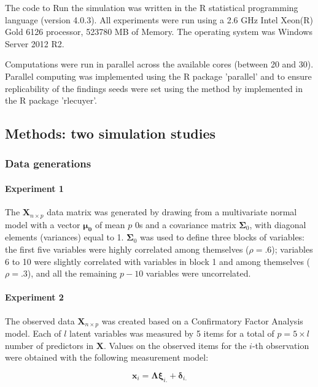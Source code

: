 	The code to Run the simulation was written in the R statistical programming language (version 4.0.3). 
	All experiments were run using a 2.6 GHz Intel Xeon(R) Gold 6126 processor, 523780 MB of Memory. The
	operating system was Windows Server 2012 R2.

	Computations were run in parallel across the available cores (between 20 and 30). Parallel computing 
	was implemented using the R package 'parallel' and to ensure replicability of the findings seeds were
	set using the method by \cite{lecuyer:2002} implemented in the R package 'rlecuyer'.

\subsection{Methods: two simulation studies}

\subsubsection{Data generations}

	\paragraph{Experiment 1} 
	The $\bm{X}_{n \times p}$ data matrix was generated by drawing from a multivariate normal 
	model with a vector $\bm{\mu_0}$ of mean $p$ 0s and a covariance matrix $\bm{\Sigma}_0$, with diagonal 
	elements (variances) equal to 1. 
	$\bm{\Sigma}_0$ was used to define three blocks of variables: 
	the first five variables were highly correlated among themselves ($\rho = .6$); 
	variables 6 to 10 were slightly correlated with variables in block 1 and among themselves ($\rho = .3$), 
	and all the remaining $p-10$ variables were uncorrelated.

	\paragraph{Experiment 2}
	The observed data $\bm{X}_{n \times p}$ was created based on a Confirmatory Factor Analysis model.
	Each of $l$ latent variables was measured by 5 items for a total of $p = 5 \times l$ number of predictors
	in $\bm{X}$.
	Values on the observed items for the $i$-th observation were obtained with the following measurement 
	model:

	\begin{equation}
		\bm{x}_i = \bm{\Lambda} \bm{\xi}_{i.} + \bm{\delta}_{i.}
	\end{equation}

